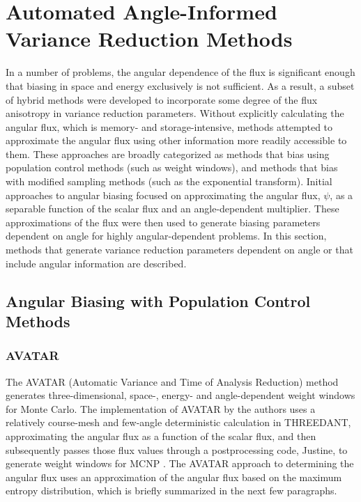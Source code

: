 \section{Automated Angle-Informed Variance Reduction Methods}
\label{sec:AngleVR}

In a number of problems, the angular dependence of the flux is significant enough that
biasing in space and energy exclusively is not
sufficient. As a result, a subset of hybrid methods were developed to incorporate some
degree of the flux anisotropy in variance reduction parameters. Without explicitly
calculating the angular flux, which is memory- and storage-intensive, methods
attempted to approximate the angular flux using other information more readily
accessible to them. These approaches are broadly categorized as methods that
bias using population control methods (such as weight windows),
and methods that bias with modified
sampling methods (such as the exponential transform).
Initial approaches
to angular biasing focused on approximating the angular flux, $\psi$,
as a separable
function of the scalar flux and an angle-dependent multiplier.
These approximations of the flux were then used to generate biasing
parameters dependent on angle for highly angular-dependent problems. In this
section, methods that generate variance reduction parameters dependent on angle
or that include angular information are described.

\subsection{Angular Biasing with Population Control Methods}

\subsubsection{AVATAR}
\label{subsec:AVATAR}

The AVATAR \cite{van_riper_generation_1995, van_riper_avatarautomatic_1997}
(Automatic Variance and Time of Analysis Reduction) method generates
three-dimensional, space-, energy- and angle-dependent weight windows for Monte
Carlo. The implementation of AVATAR by the authors
uses a relatively course-mesh and few-angle deterministic calculation in
THREEDANT, approximating the angular flux as a function of the scalar flux, and
then subsequently passes those flux values through a postprocessing
code, Justine, to generate
weight windows for MCNP \cite{mcnp_manual_v1}. The AVATAR approach to
determining the angular flux uses an approximation of the angular flux based on
the maximum entropy distribution, which is briefly summarized in the next
few paragraphs.

